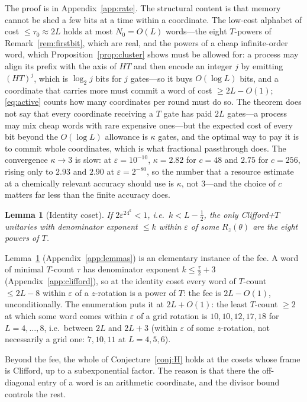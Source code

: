 \documentclass[aps,prx,twocolumn,superscriptaddress,nofootinbib,longbibliography]{revtex4-2}
\theoremstyle{plain}
\newtheorem{lemma}{Lemma}
\theoremstyle{definition}
\theoremstyle{remark}
\begin{document}
The proof is in Appendix~\ref{app:rate}. The structural content is that memory cannot be shed a few bits at a time within a coordinate. The low-cost alphabet of cost $\le\tau_0\approx2L$ holds at most $N_0=O(L)$ words---the eight $T$-powers of Remark~\ref{rem:firstbit}, which are real, and the powers of a cheap infinite-order word, which Proposition~\ref{prop:cluster} shows must be allowed for: a process may align its prefix with the axis of $HT$ and then encode an integer $j$ by emitting $(HT)^j$, which is $\log_2j$ bits for $j$ gates---so it buys $O(\log L)$ bits, and a coordinate that carries more must commit a word of cost $\ge2L-O(1)$; \eqref{eq:active} counts how many coordinates per round must do so. The theorem does not say that every coordinate receiving a $T$ gate has paid $2L$ gates---a process may mix cheap words with rare expensive ones---but the expected cost of every bit beyond the $O(\log L)$ allowance is $\kappa$ gates, and the optimal way to pay it is to commit whole coordinates, which is what fractional passthrough does. The convergence $\kappa\to3$ is slow: at $\varepsilon=10^{-10}$, $\kappa=2.82$ for $c=48$ and $2.75$ for $c=256$, rising only to $2.93$ and $2.90$ at $\varepsilon=2^{-80}$, so the number that a resource estimate at a chemically relevant accuracy should use is $\kappa$, not $3$---and the choice of $c$ matters far less than the finite accuracy does.

\begin{lemma}[Identity coset]\label{lem:identity}
If $2\varepsilon^24^k<1$, i.e.\ $k<L-\tfrac12$, the only Clifford+$T$ unitaries with denominator exponent $\le k$ within $\varepsilon$ of some $R_z(\theta)$ are the eight powers of $T$.
\end{lemma}
Lemma~\ref{lem:identity} (Appendix~\ref{app:lemmas}) is an elementary instance of the fee. A word of minimal $T$-count $\tau$ has denominator exponent $k\le\tfrac\tau2+3$ (Appendix~\ref{app:clifford}), so at the identity coset every word of $T$-count $\le2L-8$ within $\varepsilon$ of a $z$-rotation is a power of $T$: the fee is $2L-O(1)$, unconditionally. The enumeration puts it at $2L+O(1)$: the least $T$-count $\ge2$ at which some word comes within $\varepsilon$ of a grid rotation is $10,10,12,17,18$ for $L=4,\dots,8$, i.e.\ between $2L$ and $2L+3$ (within $\varepsilon$ of some $z$-rotation, not necessarily a grid one: $7,10,11$ at $L=4,5,6$).

Beyond the fee, the whole of Conjecture~\ref{conj:H} holds at the cosets whose frame is Clifford, up to a subexponential factor. The reason is that there the off-diagonal entry of a word is an arithmetic coordinate, and the divisor bound controls the rest.
\end{document}
